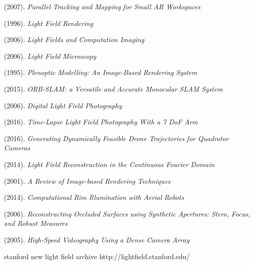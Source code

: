 \documentclass[12pt]{report}
\begin{document}
\begin{thebibliography}{10}
	(2007). \emph{Parallel Tracking and Mapping for Small AR Workspaces}	
	
	(1996). \emph{Light Field Rendering}
	
	(2006). \emph{Light Fields and Computation Imaging}

	(2006). \emph{Light Field Microscopy}
	
	(1995). \emph{Plenoptic Modelling: An Image-Based Rendering System}

	(2015). \emph{ORB-SLAM: a Versatile and Accurate Monocular SLAM System}

	(2006). \emph{Digital Light Field Photography}	

	(2016). \emph{Time-Lapse Light Field Photography With a 7 DoF Arm}

	(2016). \emph{Generating Dynamically Feasible Drone Trajectories for Quadrotor Cameras}

	(2014). \emph{Light Field Reconstruction in the Continuous Fourier Domain}

	(2001). \emph{A Review of Image-based Rendering Techniques}

	(2014). \emph{Computational Rim Illumination with Aerial Robots}

	(2006). \emph{Reconstructing Occluded Surfaces using Synthetic Apertures: Stero, Focus, and Robust Measures} 
	
	(2005). \emph{High-Speed Videography Using a Dense Camera Array}

stanford new light field archive http://lightfield.stanford.edu/

\end{thebibliography}
\end{document}
